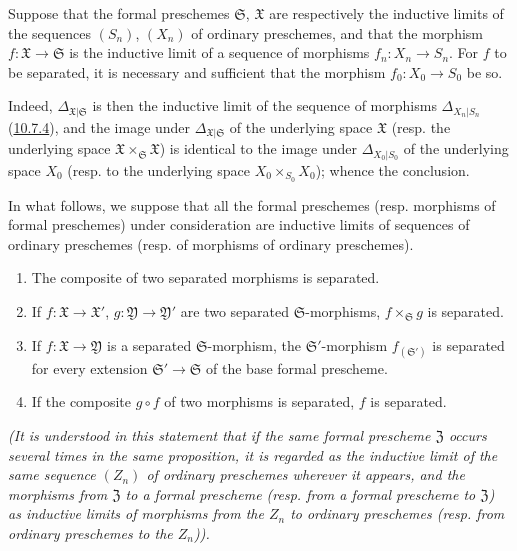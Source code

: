 \begin{proposition}[10.15.2]
\label{I.10.15.2}
Suppose that the formal preschemes $\mathfrak{S}$, $\mathfrak{X}$ are
respectively the inductive limits of the sequences $(S_n)$, $(X_n)$ of
ordinary preschemes, and that the morphism
$f:\mathfrak{X}\to\mathfrak{S}$ is the inductive limit of a sequence of
morphisms $f_n:X_n\to S_n$. For $f$ to be separated, it is necessary and
sufficient that the morphism $f_0:X_0\to S_0$ be so.
\end{proposition}

Indeed, $\Delta_{\mathfrak{X}|\mathfrak{S}}$ is then the inductive limit of
the sequence of morphisms $\Delta_{X_n|S_n}$
(\hyperref[I.10.7.4]{10.7.4}), and the image under
$\Delta_{\mathfrak{X}|\mathfrak{S}}$ of the underlying space
$\mathfrak{X}$ (resp. the underlying space
$\mathfrak{X}\times_{\mathfrak{S}}\mathfrak{X}$) is identical to the image
under $\Delta_{X_0|S_0}$ of the underlying space $X_0$ (resp. to the
underlying space $X_0\times_{S_0}X_0$); whence the conclusion.

\begin{proposition}[10.15.3]
\label{I.10.15.3}
In what follows, we suppose that all the formal preschemes (resp.
morphisms of formal preschemes) under consideration are inductive limits of
sequences of ordinary preschemes (resp. of morphisms of ordinary preschemes).
\begin{enumerate}
  \item[\rm{(i)}] The composite of two separated morphisms is separated.
  \item[\rm{(ii)}] If $f:\mathfrak{X}\to\mathfrak{X}'$,
  $g:\mathfrak{Y}\to\mathfrak{Y}'$ are two separated
  $\mathfrak{S}$-morphisms, $f\times_{\mathfrak{S}}g$ is separated.
  \item[\rm{(iii)}] If $f:\mathfrak{X}\to\mathfrak{Y}$ is a separated
  $\mathfrak{S}$-morphism, the $\mathfrak{S}'$-morphism
  $f_{(\mathfrak{S}')}$ is separated for every extension
  $\mathfrak{S}'\to\mathfrak{S}$ of the base formal prescheme.
  \item[\rm{(iv)}] If the composite $g\circ f$ of two morphisms is separated,
  $f$ is separated.
\end{enumerate}
\emph{(It is understood in this statement that if the same formal prescheme
$\mathfrak{Z}$ occurs several times in the same proposition, it is
regarded as the inductive limit of the \emph{same} sequence $(Z_n)$ of
ordinary preschemes wherever it appears, and the morphisms from
$\mathfrak{Z}$ to a formal prescheme (resp. from a formal prescheme to
$\mathfrak{Z}$) as inductive limits of morphisms from the $Z_n$ to ordinary
preschemes (resp. from ordinary preschemes to the $Z_n$)).}
\end{proposition}

